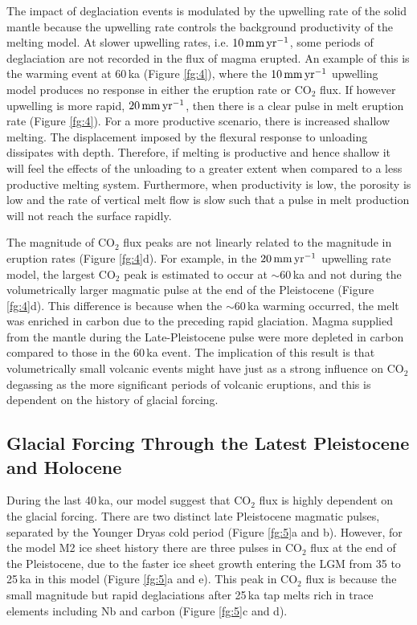 \documentclass[draft,linenumbers]{agujournal2018}
\begin{document}
The impact of deglaciation events is modulated by the upwelling rate of the solid mantle because the upwelling rate controls the background productivity of the melting model. At slower upwelling rates, i.e. $10\rm\,mm\,yr^{-1}$, some periods of deglaciation are not recorded in the flux of magma erupted. An example of this is the warming event at 60\,ka (Figure \ref{fg:4}), where the $10\rm\,mm\,yr^{-1}$ upwelling model produces no response in either the eruption rate or CO$_{2}$ flux. If however upwelling is more rapid, $20\rm\,mm\,yr^{-1}$, then there is a clear pulse in melt eruption rate (Figure \ref{fg:4}). For a more productive scenario, there is increased shallow melting. The displacement imposed by the flexural response to unloading dissipates with depth. Therefore, if melting is productive and hence shallow it will feel the effects of the unloading to a greater extent when compared to a less productive melting system. Furthermore, when productivity is low, the porosity is low and the rate of vertical melt flow is slow such that a pulse in melt production will not reach the surface rapidly.

The magnitude of CO$_{2}$ flux peaks are not linearly related to the magnitude in eruption rates (Figure \ref{fg:4}d). For example, in the $20\rm\,mm\,yr^{-1}$ upwelling rate model, the largest CO$_{2}$ peak is estimated to occur at $\sim$60\,ka and not during the volumetrically larger magmatic pulse at the end of the Pleistocene (Figure \ref{fg:4}d). This difference is because when the $\sim$60\,ka warming occurred, the melt was enriched in carbon due to the preceding rapid glaciation. Magma supplied from the mantle during the Late-Pleistocene pulse were more depleted in carbon compared to those in the 60\,ka event. The implication of this result is that volumetrically small volcanic events might have just as a strong influence on CO$_{2}$ degassing as the more significant periods of volcanic eruptions, and this is dependent on the history of glacial forcing.

\subsection{Glacial Forcing Through the Latest Pleistocene and Holocene}

During the last 40\,ka, our model suggest that CO$_{2}$ flux is highly dependent on the glacial forcing. There are two distinct late Pleistocene magmatic pulses, separated by the Younger Dryas cold period (Figure \ref{fg:5}a and b). However, for the model M2 ice sheet history there are three pulses in CO$_{2}$ flux at the end of the Pleistocene, due to the faster ice sheet growth entering the LGM from 35 to 25\,ka in this model (Figure \ref{fg:5}a and e). This peak in CO$_{2}$ flux is because the small magnitude but rapid deglaciations after 25\,ka tap melts rich in trace elements including Nb and carbon (Figure \ref{fg:5}c and d).
\end{document}
